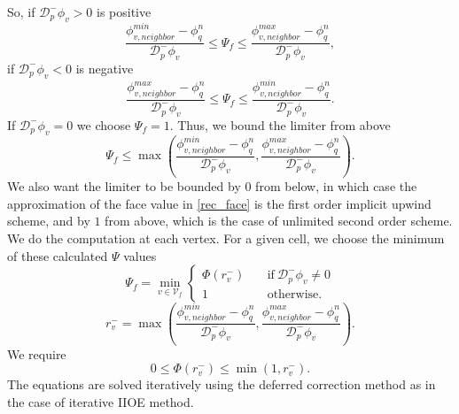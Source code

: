 \documentclass{article}
\begin{document}
So, if $ \mathcal{D}_{p}^-\phi_{v} > 0 $ is positive
\[
	\frac{\phi_{v, neighbor}^{min} - \phi_q^{n}}{\mathcal{D}_{p}^-\phi_{v}}
	\leq
	\Psi_{f}
	\leq
	\frac{\phi_{v, neighbor}^{max} - \phi_q^{n}}{\mathcal{D}_{p}^-\phi_{v}},
\]
if $ \mathcal{D}_{p}^-\phi_{v} < 0 $ is negative
\[
	\frac{\phi_{v, neighbor}^{max} - \phi_q^{n}}{\mathcal{D}_{p}^-\phi_{v}}
	\leq
	\Psi_{f}
	\leq
	\frac{\phi_{v, neighbor}^{min} - \phi_q^{n}}{\mathcal{D}_{p}^-\phi_{v}}.
\]
If $ \mathcal{D}_{p}^-\phi_{v} = 0 $ we choose $ \Psi_{f} = 1 $.
Thus, we bound the limiter from above
\[
	\Psi_{f}
	\leq
	\max \left(
		\frac{\phi_{v, neighbor}^{min} -\phi_q^{n}}{\mathcal{D}_{p}^-\phi_{v}},
		\frac{\phi_{v, neighbor}^{max} -\phi_q^{n}}{\mathcal{D}_{p}^-\phi_{v}}
		\right).
\]
We also want the limiter to be bounded by $ 0 $ from below,
in which case the approximation of the face value in \eqref{rec_face}
is the first order implicit upwind scheme, and by $ 1 $ from above,
which is the case of unlimited second order scheme.
We do the computation at each vertex. For a given cell,
we choose the minimum of these calculated $ \Psi $ values
\begin{equation}
	\Psi_{f} =
	\min_{v \in \mathcal{V}_{f}}
	\begin{cases}
		\Phi(r_{v}^-) \quad
		&\text{if} \ \mathcal{D}_{p}^-\phi_{v} \neq 0\\
		1 \quad
		&\text{otherwise}.
	\end{cases}
\end{equation}
\[
	r_{v}^- =
	\max \left(
		\frac{\phi_{v, neighbor}^{min} -\phi_q^{n}}{\mathcal{D}_{p}^-\phi_{v}},
		\frac{\phi_{v, neighbor}^{max} -\phi_q^{n}}{\mathcal{D}_{p}^-\phi_{v}}
		\right).
\]
We require
\[
	0 \leq \Phi(r_{v}^-) \leq \min(1, r_{v}^-).
\]
The equations are solved iteratively using the deferred correction method as in the case of iterative IIOE method.
\end{document}
